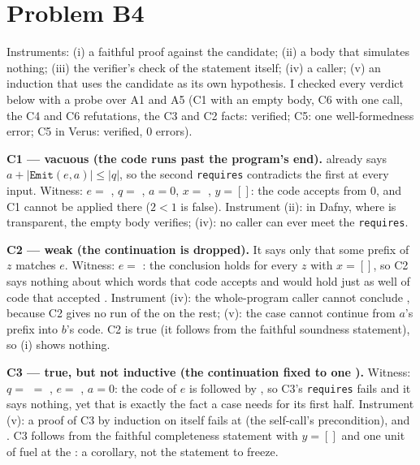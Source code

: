 \documentclass[11pt]{article}
\begin{document}
\section*{Problem B4}\label{ans:B4}
\begin{answer}
Instruments: (i) a faithful proof against the candidate; (ii) a body that
simulates nothing; (iii) the verifier's check of the statement itself; (iv) a
caller; (v) an induction that uses the candidate as its own hypothesis. I
checked every verdict below with a probe over A1 and A5 (C1 with an empty body,
C6 with one  call, the C4 and C6 refutations, the C3 and C2
facts: verified; C5: one well-formedness error; C5 in Verus: verified, 0
errors).

\textbf{C1 --- vacuous (the code runs past the program's end).} 
already says $a + |\mathtt{Emit}(e, a)| \le |q|$, so the second
\texttt{requires} contradicts the first at every input. Witness: $e =$
, $q =$ , $a = 0$, $x =$ \dfy{['a']},
$y = []$: the code accepts \dfy{['a']} from 0, and C1 cannot be applied there
($2 < 1$ is false). Instrument (ii): in Dafny, where  is
transparent, the empty body verifies; (iv): no caller can ever meet the
\texttt{requires}.

\textbf{C2 --- weak (the continuation is dropped).} It says only that some
prefix of $z$ matches $e$. Witness: $e =$ : the conclusion
holds for every $z$ with $x = []$, so C2 says nothing about which words that
code accepts and would hold just as well of code that accepted \dfy{['b']}.
Instrument (iv): the whole-program caller cannot conclude ,
because C2 gives no run of the  on the rest; (v): the 
case cannot continue from $a$'s prefix into $b$'s code. C2 is true (it follows
from the faithful soundness statement), so (i) shows nothing.

\textbf{C3 --- true, but not inductive (the continuation fixed to one
).} Witness: $q =$  $=$
, $e =$ , $a = 0$: the code
of $e$ is followed by , so C3's \texttt{requires} fails and it
says nothing, yet that is exactly the fact a  case needs for its first
half. Instrument (v): a proof of C3 by induction on itself fails at
 (the self-call's precondition),  and . C3 follows
from the faithful completeness statement with $y = []$ and one unit of fuel at
the : a corollary, not the statement to freeze.


\end{answer}
\end{document}
